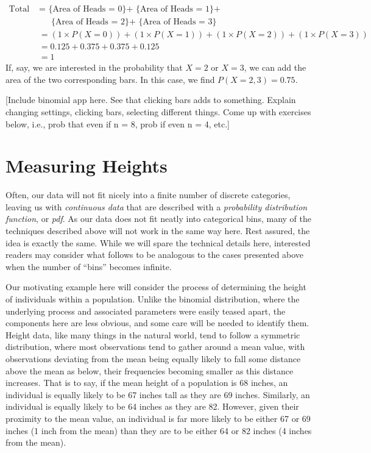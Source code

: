 \documentclass[
]{book}
\theoremstyle{definition}
\theoremstyle{definition}
\theoremstyle{definition}
\theoremstyle{remark}
\begin{document}
\[
\begin{align}
\text{Total Area } &= \text{ \{Area of Heads = 0\} + \{Area of Heads = 1\} + } \\
& \quad \ \ \text{\{Area of Heads = 2\} + \{Area of Heads = 3\}} \\
&= (1 \times P(X = 0)) + (1 \times P(X = 1)) + (1 \times P(X = 2)) + (1 \times P(X = 3)) \\
&= 0.125+0.375+0.375+0.125 \\
&= 1
\end{align}
\]
If, say, we are interested in the probability that \(X = 2\) or \(X = 3\), we can add the area of the two corresponding bars. In this case, we find \(P(X = 2, 3) = 0.75\).

{[}Include binomial app here. See that clicking bars adds to something. Explain changing settings, clicking bars, selecting different things. Come up with exercises below, i.e., prob that even if n = 8, prob if even n = 4, etc.{]}

\hypertarget{measuring-heights}{%
\section{Measuring Heights}\label{measuring-heights}}

Often, our data will not fit nicely into a finite number of discrete categories, leaving us with \emph{continuous data} that are described with a \emph{probability distribution function}, or \emph{pdf}. As our data does not fit neatly into categorical bins, many of the techniques described above will not work in the same way here. Rest assured, the idea is exactly the same. While we will spare the technical details here, interested readers may consider what follows to be analogous to the cases presented above when the number of ``bins'' becomes infinite.

Our motivating example here will consider the process of determining the height of individuals within a population. Unlike the binomial distribution, where the underlying process and associated parameters were easily teased apart, the components here are less obvious, and some care will be needed to identify them. Height data, like many things in the natural world, tend to follow a symmetric distribution, where most observations tend to gather around a mean value, with observations deviating from the mean being equally likely to fall some distance above the mean as below, their frequencies becoming smaller as this distance increases. That is to say, if the mean height of a population is 68 inches, an individual is equally likely to be 67 inches tall as they are 69 inches. Similarly, an individual is equally likely to be 64 inches as they are 82. However, given their proximity to the mean value, an individual is far more likely to be either 67 or 69 inches (1 inch from the mean) than they are to be either 64 or 82 inches (4 inches from the mean).
\end{document}
